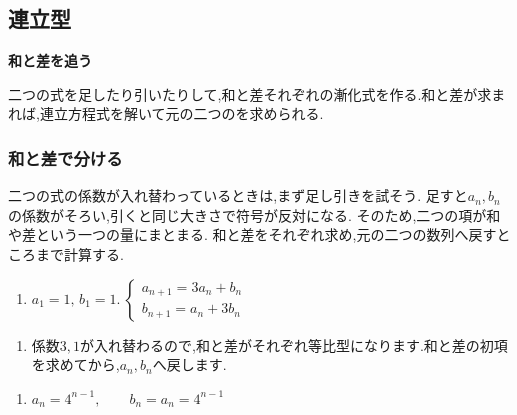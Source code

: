 
\subsection{連立型}\label{節：連立型}
  \begin{bookpoint}
    \textbf{和と差を追う}\par
    二つの式を足したり引いたりして,和と差それぞれの漸化式を作る.和と差が求まれば,連立方程式を解いて元の二つのを求められる.
  \end{bookpoint}
  \subsubsection{和と差で分ける}
    二つの式の係数が入れ替わっているときは,まず足し引きを試そう.
    足すと$a_n,b_n$の係数がそろい,引くと同じ大きさで符号が反対になる.
    そのため,二つの項が和や差という一つの量にまとまる.
    和と差をそれぞれ求め,元の二つの数列へ戻すところまで計算する.

    \noindent {}\par\nobreak
    \begin{enumerate}[label=(\arabic*),parsep=3pt,format=\bookitemlink{example-system-1}{problem}{answer}]
      \item $\displaystyle a_1=1,\,b_1=1.\ \begin{cases}a_{n+1}=3a_n+b_n\\ b_{n+1}=a_n+3b_n\end{cases}$
    \end{enumerate}

    \noindent {}\par\nobreak
    \begin{enumerate}[label=(\arabic*),parsep=3pt,format=\bookitemlink{example-system-1}{hint}{problem}]
      \item 係数$3,1$が入れ替わるので,和と差がそれぞれ等比型になります.和と差の初項を求めてから,$a_n,b_n$へ戻します.
    \end{enumerate}

    \noindent {}\par\nobreak
    \begin{enumerate}[label=(\arabic*),parsep=3pt,format=\bookitemlink{example-system-1}{answer}{problem}]
      \item $\displaystyle a_n=4^{n-1},\qquad b_n=a_n=4^{n-1}$
    \end{enumerate}

